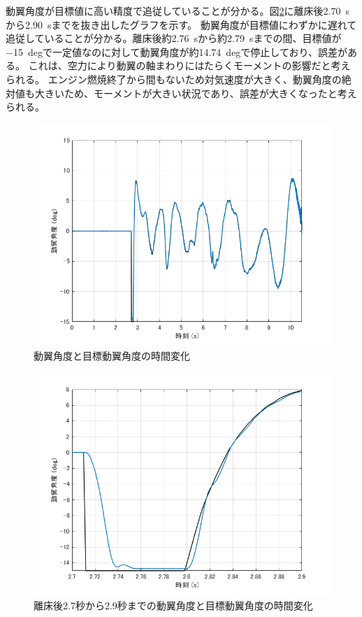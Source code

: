 \documentclass[a4paper,11pt,uplatex]{jsarticle}
\begin{document}
動翼角度が目標値に高い精度で追従していることが分かる。図\ref{fig:動翼角度_切り取り}に離床後\SI{2.70}{s}から\SI{2.90}{s}までを抜き出したグラフを示す。
動翼角度が目標値にわずかに遅れて追従していることが分かる。離床後約\SI{2.76}{s}から約\SI{2.79}{s}までの間、目標値が\SI{-15}{deg}で一定値なのに対して動翼角度が約\SI{14.74}{deg}で停止しており、誤差がある。
これは、空力により動翼の軸まわりにはたらくモーメントの影響だと考えられる。
エンジン燃焼終了から間もないため対気速度が大きく、動翼角度の絶対値も大きいため、モーメントが大きい状況であり、誤差が大きくなったと考えられる。
\begin{figure}[H]
	\centering
	\includegraphics[width=0.8\linewidth]{pic_avi/動翼角度.png}
	\caption{動翼角度と目標動翼角度の時間変化}
	\label{fig:動翼角度}
\end{figure}
\begin{figure}[H]
	\centering
	\includegraphics[width=0.8\linewidth]{pic_avi/動翼角度_切り取り.png}
	\caption{離床後2.7秒から2.9秒までの動翼角度と目標動翼角度の時間変化}
	\label{fig:動翼角度_切り取り}
\end{figure}
\end{document}
